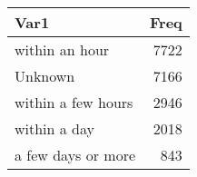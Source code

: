 \begin{table}[H]
\centering
\begin{tabular}[t]{lr}
\toprule
Var1 & Freq\\
\midrule
within an hour & 7722\\
Unknown & 7166\\
within a few hours & 2946\\
within a day & 2018\\
a few days or more & 843\\
\bottomrule
\end{tabular}
\end{table}
